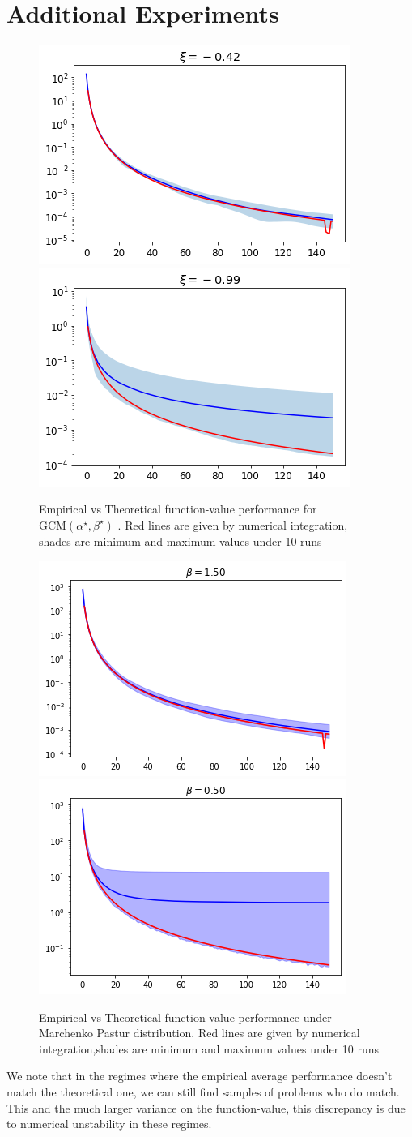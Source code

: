 \documentclass{article}
\begin{document}
\section{Additional Experiments} \label{appendix: experiments}

\begin{figure}[H]
    \centering
    \includegraphics[width= 0.4 \textwidth]{new_imgs/stable xi.png}
    \includegraphics[width= 0.4 \textwidth]{new_imgs/unstable xi.png}
    \caption{Empirical vs Theoretical function-value performance for $\text{GCM}(\alpha^\star,\beta^\star)$ . Red lines are given by numerical integration, shades are minimum and maximum values under 10 runs}
    \label{fig:my_label}
\end{figure}

\begin{figure}[H]
    \centering
    \includegraphics[width= 0.4 \textwidth]{new_imgs/stable beta.png}\includegraphics[width= 0.4 \textwidth]{new_imgs/unstable beta.png}
    \caption{Empirical vs Theoretical function-value performance under Marchenko Pastur distribution. Red lines are given by numerical integration,shades are minimum and maximum values under 10 runs}
    \label{fig:my_label}
\end{figure}
We note that in the regimes where the empirical average performance doesn't match the theoretical one, we can still find samples of problems who do match. This and the much larger variance on the function-value, this discrepancy is due to numerical unstability in these regimes.
\end{document}
